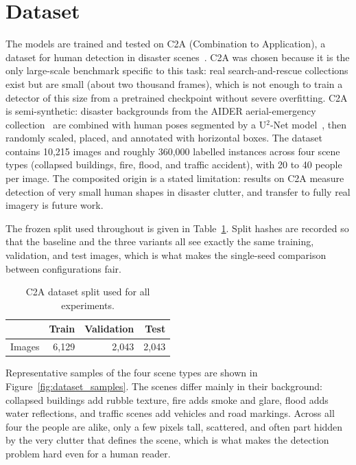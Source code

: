 \section{Dataset}
\label{sec:dataset}
The models are trained and tested on C2A (Combination to Application), a
dataset for human detection in disaster scenes~\cite{nihal2024c2a}. C2A was
chosen because it is the only large-scale benchmark specific to this task:
real search-and-rescue collections exist but are small (about two thousand
frames), which is not enough to train a detector of this size from a
pretrained checkpoint without severe overfitting. C2A is semi-synthetic:
disaster backgrounds from the AIDER aerial-emergency
collection~\cite{kyrkou2020aider} are combined with human poses segmented by
a U$^2$-Net model~\cite{qin2020u2net}, then randomly scaled, placed, and
annotated with horizontal boxes. The dataset contains 10{,}215 images and
roughly 360{,}000 labelled instances across four scene types (collapsed
buildings, fire, flood, and traffic accident), with 20 to 40 people per
image. The composited origin is a stated limitation: results on C2A measure
detection of very small human shapes in disaster clutter, and transfer to
fully real imagery is future work.

The frozen split used throughout is given in Table~\ref{tab:split}. Split
hashes are recorded so that the baseline and the three variants all see
exactly the same training, validation, and test images, which is what makes
the single-seed comparison between configurations fair.

\begin{table}[H]
  \centering
  \caption{C2A dataset split used for all experiments.}
  \label{tab:split}
  \begin{tabular}{@{}l r r r@{}}
    \toprule
     & \textbf{Train} & \textbf{Validation} & \textbf{Test} \\
    \midrule
    Images & 6{,}129 & 2{,}043 & 2{,}043 \\
    \bottomrule
  \end{tabular}
\end{table}

Representative samples of the four scene types are shown in
Figure~\ref{fig:dataset_samples}. The scenes differ mainly in their
background: collapsed buildings add rubble texture, fire adds smoke and glare,
flood adds water reflections, and traffic scenes add vehicles and road
markings. Across all four the people are alike, only a few pixels tall,
scattered, and often part hidden by the very clutter that defines the scene,
which is what makes the detection problem hard even for a human reader.

